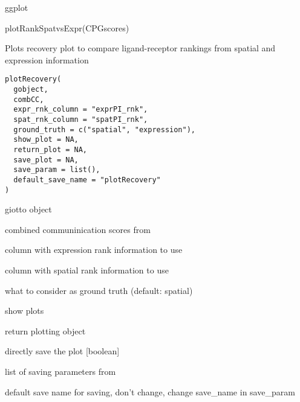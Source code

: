 \documentclass[a4paper]{book}
\begin{document}
%
\begin{Value}
ggplot
\end{Value}
%
\begin{Examples}
\begin{ExampleCode}
    plotRankSpatvsExpr(CPGscores)
\end{ExampleCode}
\end{Examples}
%
\begin{Description}\relax
Plots recovery plot to compare ligand-receptor rankings from spatial and expression information
\end{Description}
%
\begin{Usage}
\begin{verbatim}
plotRecovery(
  gobject,
  combCC,
  expr_rnk_column = "exprPI_rnk",
  spat_rnk_column = "spatPI_rnk",
  ground_truth = c("spatial", "expression"),
  show_plot = NA,
  return_plot = NA,
  save_plot = NA,
  save_param = list(),
  default_save_name = "plotRecovery"
)
\end{verbatim}
\end{Usage}
%
\begin{Arguments}
\begin{ldescription}
\item[\code{gobject}] giotto object

\item[\code{combCC}] combined communinication scores from 

\item[\code{expr\_rnk\_column}] column with expression rank information to use

\item[\code{spat\_rnk\_column}] column with spatial rank information to use

\item[\code{ground\_truth}] what to consider as ground truth (default: spatial)

\item[\code{show\_plot}] show plots

\item[\code{return\_plot}] return plotting object

\item[\code{save\_plot}] directly save the plot [boolean]

\item[\code{save\_param}] list of saving parameters from 

\item[\code{default\_save\_name}] default save name for saving, don't change, change save\_name in save\_param
\end{ldescription}
\end{Arguments}
\end{document}
